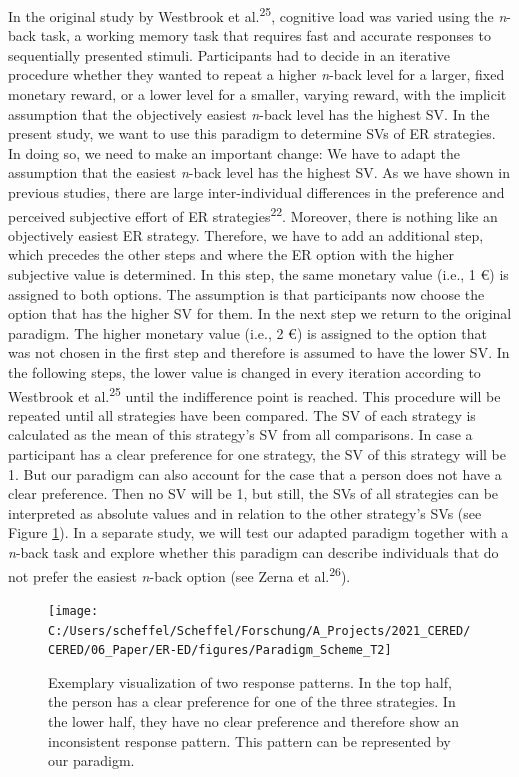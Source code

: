 \documentclass[
  english,
  man,floatsintext]{apa6}
\begin{document}
In the original study by Westbrook et al.\textsuperscript{25}, cognitive load was varied using the \emph{n}-back task, a working memory task that requires fast and accurate responses to sequentially presented stimuli.
Participants had to decide in an iterative procedure whether they wanted to repeat a higher \emph{n}-back level for a larger, fixed monetary reward, or a lower level for a smaller, varying reward, with the implicit assumption that the objectively easiest \emph{n}-back level has the highest SV.
In the present study, we want to use this paradigm to determine SVs of ER strategies.
In doing so, we need to make an important change: We have to adapt the assumption that the easiest \emph{n}-back level has the highest SV.
As we have shown in previous studies, there are large inter-individual differences in the preference and perceived subjective effort of ER strategies\textsuperscript{22}.
Moreover, there is nothing like an objectively easiest ER strategy.
Therefore, we have to add an additional step, which precedes the other steps and where the ER option with the higher subjective value is determined.
In this step, the same monetary value (i.e., 1 €) is assigned to both options.
The assumption is that participants now choose the option that has the higher SV for them.
In the next step we return to the original paradigm.
The higher monetary value (i.e., 2 €) is assigned to the option that was not chosen in the first step and therefore is assumed to have the lower SV.
In the following steps, the lower value is changed in every iteration according to Westbrook et al.\textsuperscript{25} until the indifference point is reached.
This procedure will be repeated until all strategies have been compared.
The SV of each strategy is calculated as the mean of this strategy's SV from all comparisons.
In case a participant has a clear preference for one strategy, the SV of this strategy will be 1.
But our paradigm can also account for the case that a person does not have a clear preference.
Then no SV will be 1, but still, the SVs of all strategies can be interpreted as absolute values and in relation to the other strategy's SVs (see Figure \ref{fig:ResponsePatterns}).
In a separate study, we will test our adapted paradigm together with a \emph{n}-back task and explore whether this paradigm can describe individuals that do not prefer the easiest \emph{n}-back option (see Zerna et al.\textsuperscript{26}).

\begin{figure}
\texttt{[image: C:/Users/scheffel/Scheffel/Forschung/A\_Projects/2021\_CERED/CERED/06\_Paper/ER-ED/figures/Paradigm\_Scheme\_T2]} \caption{Exemplary visualization of two response patterns. In the top half, the person has a clear preference for one of the three strategies. In the lower half, they have no clear preference and therefore show an inconsistent response pattern. This pattern can be represented by our paradigm.}\label{fig:ResponsePatterns}
\end{figure}
\end{document}
